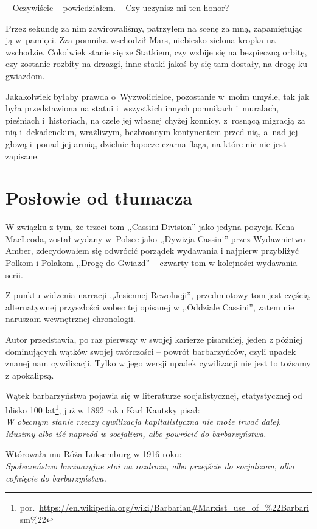 \documentclass[oneside,polish,11pt,sfheadings]{mwbk}
\begin{document}
-- Oczywiście -- powiedziałem. -- Czy uczynisz mi ten honor?

Przez sekundę za nim zawirowaliśmy, patrzyłem na scenę za mną,
zapamiętując ją w~pamięci. Zza pomnika wschodził Mars, niebiesko-zielona
kropka na wschodzie. Cokolwiek stanie się ze Statkiem, czy wzbije się na
bezpieczną orbitę, czy zostanie rozbity na drzazgi, inne statki jakoś by
się tam dostały, na drogę ku gwiazdom.

Jakakolwiek byłaby prawda o~Wyzwolicielce, pozostanie w~moim umyśle, tak
jak była przedstawiona na statui i~wszystkich innych pomnikach i~muralach, pieśniach i~historiach, na czele jej własnej chyżej konnicy, z~rosnącą migracją za nią i~dekadenckim, wrażliwym, bezbronnym kontynentem
przed nią, a~nad jej głową i~ponad jej armią, dzielnie łopocze czarna
flaga, na które nic nie jest zapisane.


\chapter*{Posłowie od tłumacza}

W związku z tym, że trzeci tom ,,Cassini Division'' jako jedyna pozycja Kena MacLeoda, został wydany w~Polsce jako ,,Dywizja Cassini'' przez Wydawnictwo Amber, zdecydowałem się odwrócić porządek wydawania i najpierw przybliżyć Polkom i Polakom ,,Drogę do Gwiazd'' -- czwarty tom w kolejności wydawania serii.

Z punktu widzenia narracji ,,Jesiennej Rewolucji'', przedmiotowy tom jest częścią alternatywnej przyszłości wobec tej opisanej w ,,Oddziale Cassini'', zatem nie naruszam wewnętrznej chronologii.

Autor przedstawia, po raz pierwszy w swojej karierze pisarskiej, jeden z później dominujących wątków swojej twórczości -- powrót barbarzyńców, czyli upadek znanej nam cywilizacji. Tylko w jego wersji upadek cywilizacji nie jest to tożsamy z apokalipsą.

Wątek barbarzyństwa pojawia się w literaturze socjalistycznej, etatystycznej od blisko 100 lat\footnote{por.~\url{https://en.wikipedia.org/wiki/Barbarian\#Marxist_use_of_\%22Barbarism\%22}}, już w 1892 roku Karl Kautsky pisał:\\
\textit{W obecnym stanie rzeczy cywilizacja kapitalistyczna nie może trwać dalej.  Musimy albo iść naprzód w socjalizm, albo powrócić do barbarzyństwa.
}

Wtórowała mu Róża Luksemburg w 1916 roku: \\ 
\textit{Społeczeństwo burżuazyjne stoi na rozdrożu, albo przejście do socjalizmu, albo cofnięcie do barbarzyństwa.}
\end{document}
